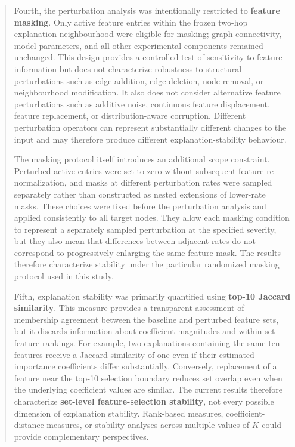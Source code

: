 \documentclass[a4paper]{article}
\begin{document}
\begin{quote}
Fourth, the perturbation analysis was intentionally restricted to
\textbf{feature masking}. Only active feature entries within the frozen
two-hop explanation neighbourhood were eligible for masking; graph
connectivity, model parameters, and all other experimental components
remained unchanged. This design provides a controlled test of
sensitivity to feature information but does not characterize robustness
to structural perturbations such as edge addition, edge deletion, node
removal, or neighbourhood modification. It also does not consider
alternative feature perturbations such as additive noise, continuous
feature displacement, feature replacement, or distribution-aware
corruption. Different perturbation operators can represent substantially
different changes to the input and may therefore produce different
explanation-stability behaviour.

The masking protocol itself introduces an additional scope constraint.
Perturbed active entries were set to zero without subsequent feature
re-normalization, and masks at different perturbation rates were sampled
separately rather than constructed as nested extensions of lower-rate
masks. These choices were fixed before the perturbation analysis and
applied consistently to all target nodes. They allow each masking
condition to represent a separately sampled perturbation at the
specified severity, but they also mean that differences between adjacent
rates do not correspond to progressively enlarging the same feature
mask. The results therefore characterize stability under the particular
randomized masking protocol used in this study.

Fifth, explanation stability was primarily quantified using
\textbf{top-10 Jaccard similarity}. This measure provides a transparent
assessment of membership agreement between the baseline and perturbed
feature sets, but it discards information about coefficient magnitudes
and within-set feature rankings. For example, two explanations
containing the same ten features receive a Jaccard similarity of one
even if their estimated importance coefficients differ substantially.
Conversely, replacement of a feature near the top-10 selection boundary
reduces set overlap even when the underlying coefficient values are
similar. The current results therefore characterize \textbf{set-level
feature-selection stability}, not every possible dimension of
explanation stability. Rank-based measures, coefficient-distance
measures, or stability analyses across multiple values of \(K\) could
provide complementary perspectives.


\end{quote}
\end{document}

